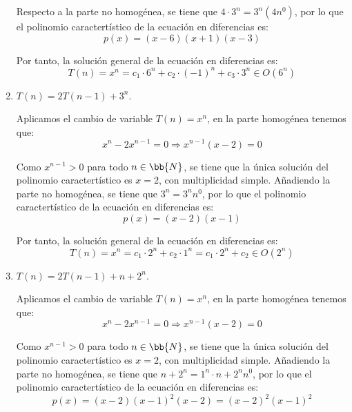 \begin{ejercicio}
\begin{enumerate}[label=\alph*)]
        Respecto a la parte no homogénea, se tiene que $4\cdot 3^n = 3^n (4n^0)$, por lo que el polinomio caractertístico de la ecuación en diferencias es:
        \begin{equation*}
            p(x) = (x-6)(x+1)(x-3)
        \end{equation*}

        Por tanto, la solución general de la ecuación en diferencias es:
        \begin{equation*}
            T(n) = x^n = c_1\cdot 6^n + c_2\cdot (-1)^n + c_3\cdot 3^n \in O(6^n)
        \end{equation*}

        \item $T(n)=2T(n-1) + 3^n$.
        
        Aplicamos el cambio de variable $T(n)=x^n$, en la parte homogénea tenemos que:
        \begin{equation*}
            x^n - 2x^{n-1} = 0 \Longrightarrow x^{n-1}(x-2)=0
        \end{equation*}

        Como $x^{n-1}>0$ para todo $n\in \bb{N}$, se tiene que la única solución del polinomio caractertístico es $x=2$,
        con multiplicidad simple. Añadiendo la parte no homogénea, se tiene que $3^n = 3^n n^0$, por lo que el polinomio caractertístico
        de la ecuación en diferencias es:
        \begin{equation*}
            p(x) = (x-2)(x-1)
        \end{equation*}

        Por tanto, la solución general de la ecuación en diferencias es:
        \begin{equation*}
            T(n) = x^n = c_1\cdot 2^n + c_2\cdot 1^n = c_1\cdot 2^n + c_2 \in O(2^n)
        \end{equation*}

        \item $T(n)=2T(n-1) + n+2^n$.
        
        Aplicamos el cambio de variable $T(n)=x^n$, en la parte homogénea tenemos que:
        \begin{equation*}
            x^n - 2x^{n-1} = 0 \Longrightarrow x^{n-1}(x-2)=0
        \end{equation*}

        Como $x^{n-1}>0$ para todo $n\in \bb{N}$, se tiene que la única solución del polinomio caractertístico es $x=2$,
        con multiplicidad simple. Añadiendo la parte no homogénea, se tiene que $n+2^n = 1^n \cdot n + 2^n n^0$, por lo que el polinomio caractertístico
        de la ecuación en diferencias es:
        \begin{equation*}
            p(x) = (x-2)(x-1)^2(x-2) = (x-2)^2(x-1)^2
        \end{equation*}


\end{enumerate}
\end{ejercicio}
